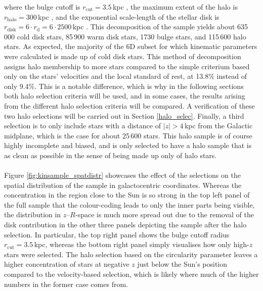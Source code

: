 \documentclass[a4paper,11pt]{article}
\begin{document}
where the bulge cutoff is $r_\mathrm{cut}=3.5$\,kpc \citep{zhu22,sotillo23}, the maximum extent of the halo is $r_\mathrm{halo}=300$\,kpc \citep{sotillo23,chen23}, and the exponential scale-length of the stellar disk is $r_\mathrm{disk}=6\cdot r_\mathrm{d}=6\cdot2500$\,kpc \citep[][p. 18]{sotillo22,binney08}. This decomposition of the sample yields about 635\,000 cold disk stars, 85\,900 warm disk stars, 1730 bulge stars, and 115\,600 halo stars. As expected, the majority of the 6D subset for which kinematic parameters were calculated is made up of cold disk stars. This method of decomposition assigns halo membership to more stars compared to the simple criterium based only on the stars' velocities and the local standard of rest, at 13.8\% instead of only 9.4\%. This is a notable difference, which is why in the following sections both halo selection criteria will be used, and in some cases, the results arising from the different halo selection criteria will be compared. A verification of these two halo selections will be carried out in Section \ref{halo_selec}. Finally, a third selection is to only include stars with a distance of $|z|>4$\,kpc from the Galactic midplane, which is the case for about 25\,600 stars. This halo sample is of course highly incomplete and biased, and is only selected to have a halo sample that is as clean as possible in the sense of being made up only of halo stars.\\ \\
%
Figure \ref{fig:kinsample_spatdistr} showcases the effect of the selections on the spatial distribution of the sample in galactocentric coordinates. Whereas the concentration in the region close to the Sun is so strong in the top left panel of the full sample that the colour-coding leads to only the inner parts being visible, the distribution in $z$--$R$-space is much more spread out due to the removal of the disk contribution in the other three panels depicting the sample after the halo selection. In particular, the top right panel shows the bulge cutoff radius $r_\mathrm{cut}=3.5$\,kpc, whereas the bottom right panel simply visualises how only high-$z$ stars were selected. The halo selection based on the circularity parameter leaves a higher concentration of stars at negative $z$ just below the Sun's position compared to the velocity-based selection, which is likely where much of the higher numbers in the former case comes from.\\ \\
%
\end{document}
